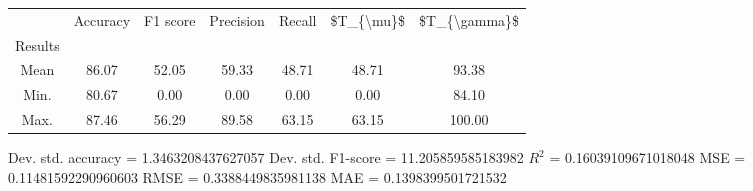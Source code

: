 \begin{tabular}{|c|c|c|c|c|c|c|}
\toprule
{} &  Accuracy &  F1 score &  Precision &  Recall &  \$T\_\{\textbackslash mu\}\$ &  \$T\_\{\textbackslash gamma\}\$ \\
Results &           &           &            &         &            &               \\
\hline
Mean    &     86.07 &     52.05 &      59.33 &   48.71 &      48.71 &         93.38 \\
Min.    &     80.67 &      0.00 &       0.00 &    0.00 &       0.00 &         84.10 \\
Max.    &     87.46 &     56.29 &      89.58 &   63.15 &      63.15 &        100.00 \\
\bottomrule
\end{tabular}

 Dev. std. accuracy = 1.3463208437627057
 Dev. std. F1-score = 11.205859585183982
 $R^2$ = 0.16039109671018048
 MSE = 0.11481592290960603
 RMSE = 0.3388449835981138
 MAE = 0.1398399501721532